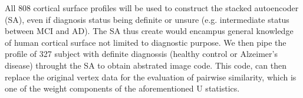 All 808 cortical surface profiles will be used to construct the stacked autoencoder (SA), even if diagnosis status being definite or unsure (e.g. intermediate status between MCI and AD). The SA thus create would encampus general knowledge of human cortical surface not limited to diagnostic purpose. We then pipe the profile of 327 subject with definite diagnossis (healthy control or Alzeimer's disease) throught the SA to obtain abstrated image code. This code, can then replace the original vertex data for the evaluation of pairwise similarity, which is one of the weight components of the aforementioned U statistics.
